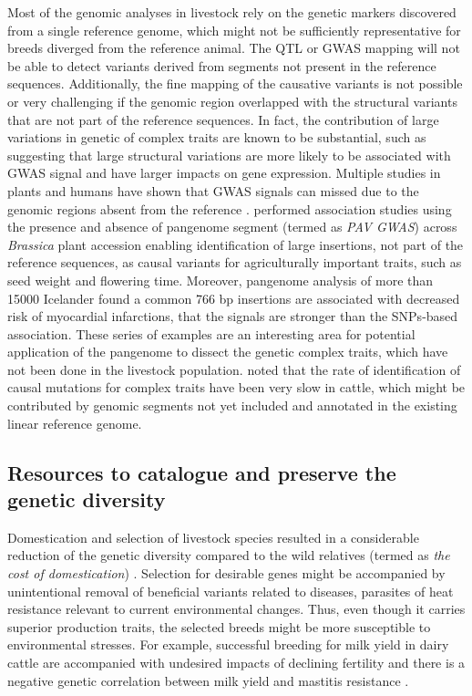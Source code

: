 \documentclass[../main.tex]{subfiles}
\begin{document}
Most of the genomic analyses in livestock rely on the genetic markers discovered from a single reference genome, which might not be sufficiently representative for breeds diverged from the reference animal. The QTL or GWAS mapping will not be able to detect variants derived from segments not present in the reference sequences. Additionally, the fine mapping of the causative variants is not possible or very challenging if the genomic region overlapped with the structural variants that are not part of the reference sequences. In fact, the contribution of large variations in genetic of complex traits are known to be substantial, such as \citep{chiang2017impact,chaisson2019multi} suggesting that large structural variations are more likely to be associated with GWAS signal and have larger impacts on gene expression. Multiple studies in plants and humans have shown that GWAS signals can missed due to the genomic regions absent from the reference  \citep{kehr2017diversity,gage2019multiple,song2020eight}. \citet{song2020eight} performed association studies using the presence and absence of pangenome segment (termed as \emph{PAV GWAS}) across \emph{Brassica} plant accession enabling identification of large insertions, not part of the reference sequences, as causal variants for agriculturally important traits, such as seed weight and flowering time. Moreover, pangenome analysis of more than 15000 Icelander found a common 766 bp insertions \citep{kehr2017diversity} are associated with decreased risk of myocardial infarctions, that the signals are stronger than the SNPs-based association. These series of examples are an interesting area for potential application of the pangenome to dissect the genetic complex traits, which have not been done in the livestock population. \citet{hayes20191000} noted that the rate of identification of causal mutations for complex traits have been very slow in cattle, which might be contributed by genomic segments not yet included and annotated in the existing linear reference genome. 


\subsection*{Resources to catalogue and preserve the genetic diversity}

Domestication and selection of livestock species resulted in a considerable reduction of the genetic diversity compared to the wild relatives (termed as \emph{the cost of domestication}) \citep{mchugo2019unlocking} . Selection for desirable genes might be accompanied by unintentional removal of beneficial variants related to diseases, parasites of heat resistance relevant to current environmental changes. Thus, even though it carries superior production traits, the selected breeds might be more susceptible to environmental stresses. For example, successful breeding for milk yield in dairy cattle are accompanied with undesired impacts of declining fertility \citep{pryce2004fertility} and there is a negative genetic correlation between milk yield and mastitis resistance \citep{cai2020distinguishing}. 
\end{document}
